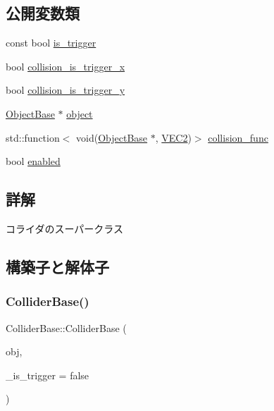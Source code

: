 \subsection*{公開変数類}
\begin{DoxyCompactItemize}
\item 
const bool \mbox{\hyperlink{class_collider_base_a0664409b8b88719fd5ac4bd350ea3b8f}{is\+\_\+trigger}}
\item 
bool \mbox{\hyperlink{class_collider_base_ae26c13f9f9ac56fe2b8010d6fa9eb504}{collision\+\_\+is\+\_\+trigger\+\_\+x}}
\item 
bool \mbox{\hyperlink{class_collider_base_a920eaa089f531e1e62b1ce8898b46453}{collision\+\_\+is\+\_\+trigger\+\_\+y}}
\item 
\mbox{\hyperlink{class_object_base}{Object\+Base}} $\ast$ \mbox{\hyperlink{class_collider_base_a63adac6a75877857abe9ff2cf4274157}{object}}
\item 
std\+::function$<$ void(\mbox{\hyperlink{class_object_base}{Object\+Base}} $\ast$, \mbox{\hyperlink{transform_8h_afb0c5e21d4133ff4f200992c0b534e1b}{V\+E\+C2}})$>$ \mbox{\hyperlink{class_collider_base_a5ac4f3c76c753790abef75e3eb7accbe}{collision\+\_\+func}}
\item 
bool \mbox{\hyperlink{class_collider_base_a812053f247dc6357357bdf9353dded77}{enabled}}
\end{DoxyCompactItemize}


\subsection{詳解}
コライダのスーパークラス 

\subsection{構築子と解体子}
\mbox{\label{class_collider_base_a61d7057a7e05549088f2b15c1e525858}} 
\subsubsection{\texorpdfstring{Collider\+Base()}{ColliderBase()}}
{\footnotesize\ttfamily Collider\+Base\+::\+Collider\+Base (\begin{DoxyParamCaption}\item[{\mbox{\hyperlink{class_object_base}{Object\+Base}} $\ast$}]{obj,  }\item[{bool}]{\+\_\+is\+\_\+trigger = {\ttfamily false} }\end{DoxyParamCaption})\hspace{0.3cm}{\ttfamily [inline]}}



